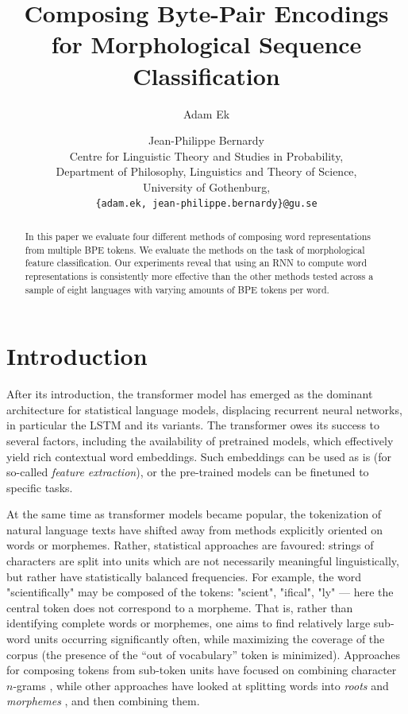 \documentclass[11pt]{article}
\title{Composing Byte-Pair Encodings for Morphological Sequence Classification}
\author{Adam Ek \and Jean-Philippe Bernardy\\
	Centre for Linguistic Theory and Studies in Probability,\\
	Department of Philosophy, Linguistics and Theory of Science,\\
	University of Gothenburg,\\
	\texttt{\{adam.ek, jean-philippe.bernardy\}@gu.se}}
\date{}
\newcommand\citep{\cite}
\begin{document}
	\maketitle
	
	\begin{abstract}
                		In this paper we evaluate four different
     methods of composing word representations from multiple BPE
     tokens. We evaluate the methods on the task of morphological
     feature classification. Our experiments reveal that using an RNN
     to compute word representations is consistently more effective
     than the other methods tested across a sample of eight languages
     with varying amounts of BPE tokens per word.
	\end{abstract}
	
	\section{Introduction}
	\label{intro}

            After its introduction, the transformer model
     \citep{vaswani2017attention} has emerged as the dominant
     architecture for statistical language models, displacing
     recurrent neural networks, in particular the LSTM and its
     variants. The transformer owes its success to several factors,
     including the availability of pretrained models, which
     effectively yield rich contextual word embeddings. Such
     embeddings can be used as is (for so-called \emph{feature extraction}),
     or the pre-trained models can be finetuned to specific
     tasks.

    	At the same time as transformer models became popular, the
     tokenization of natural language texts have shifted away from
     methods explicitly oriented on words or morphemes. Rather,
     statistical approaches are favoured: strings of
     characters are split into units which are not necessarily meaningful
     linguistically, but rather have statistically balanced
     frequencies. For example, the word "scientifically" may be
     composed of the tokens: "scient", "ifical", "ly" --- here the
     central token does not correspond to a morpheme.
             That is, rather than identifying complete words or
     morphemes, one aims to find relatively large sub-word units
     occurring significantly often, while maximizing the coverage of
     the corpus (the presence of the ``out of vocabulary'' token is
     minimized). Approaches for composing tokens from sub-token units
     have focused on combining character $n$-grams
     \citep{bojanowski2017enriching}, while other approaches have
     looked at splitting words into \textit{roots} and
     \textit{morphemes}
     \citep{el2012orthographic,chaudhary2018adapting,xu2017implicitly},
     and then combining them.
\end{document}
